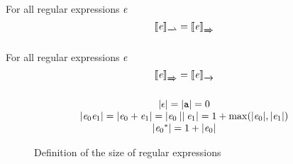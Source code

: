 \begin{theorem}
 For all regular expressions $\mathit {e}$
 \[
  \opSem{\re}{\parDer{}{}}=\opSem{\re}{\derSet{}}
 \]
\end{theorem}

\begin{theorem}
 For all regular expressions $\mathit {e}$
 \[
  \left\llbracket{\ensuremath{\mathit {e}}}\right\rrbracket_{\xRightarrow{}}=\left\llbracket{\ensuremath{\mathit {e}}}\right\rrbracket_{\xrightarrow{}}
 \]
\end{theorem}

\begin{figure}
 $$
  \begin{array}{c}
   {\mid}{\ensuremath{\mathtt {\epsilon}}}{\mid}={\mid}{\mathtt {a}}{\mid}=0                                                                                             \\
   {\mid}{\mathit {e}_0\mathit {e}_1}{\mid}={\mid}{\mathit {e}_0\mathbin{+}\mathit {e}_1}{\mid}={\mid}{\mathit {e}_0\mathbin{||}\mathit {e}_1}{\mid}=1+\max({\mid}{\mathit {e}_0}{\mid},{\mid}{\mathit {e}_1}{\mid}) \\
   {\mid}{{\mathit {e}_0}^*}{\mid}=1+{\mid}{\mathit {e}_0}{\mid}
  \end{array}
 $$
 \caption{Definition of the size of regular expressions}
 \label{fig:size}
\end{figure}

